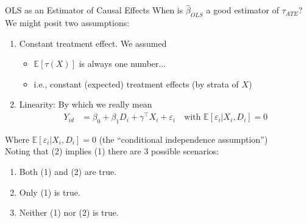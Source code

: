 \documentclass[xcolor=dvipsnames]{beamer}
\renewcommand{\epsilon}{\varepsilon}
\newcommand\E{\mathbb{E}}
\begin{document}
\begin{frame}{OLS as an Estimator of Causal Effects}
\small
{} When is $\hat{\beta}_{OLS}$ a good estimator of $\tau_{ATE}$?\\
\medskip
{} We might posit two assumptions:
\begin{enumerate}
\item[(1)]<3-> \alert{Constant treatment effect}. We assumed
\begin{itemize}
\item $\E[\tau(X)]$ is always one number... 
\item i.e., constant (expected) treatment effects (by strata of $X$)
\end{itemize}
\item[(2)]<4-> \alert{Linearity}: %
By which we really mean
 \begin{align*}
 	Y_{id} &= \beta_0 + \beta_1 D_i  + \gamma^{\top}X_i + \epsilon_i \quad \text{with } \E[\epsilon_i|X_i, D_i]=0
 \end{align*}
\end{enumerate}
\vspace{-.2in}
 Where $\E[\epsilon_i|X_i, D_i]=0$ (the ``conditional independence assumption'')\\
 Noting that (2) implies (1) there are 3 possible scenarios:
\footnotesize
\begin{enumerate}
\addtolength{\itemsep}{-.25\baselineskip}
\item Both (1) and (2) are true.
\item Only (1) is true.
\item Neither (1) nor (2) is true.
\end{enumerate}
\end{frame}
\end{document}

